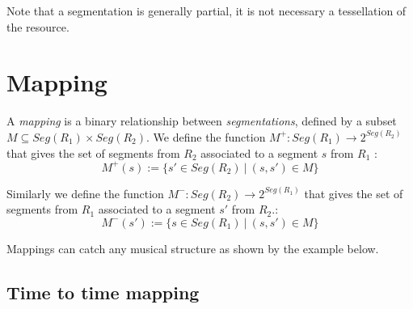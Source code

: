 \documentclass[letterpaper, 12pt]{article}
\newcommand{\seg}[1]			{Seg(#1)}
\begin{document}
Note that a segmentation is generally partial, it is not necessary a tessellation of the resource. %


\section{Mapping}
\label{resmap}



A \emph{mapping} is a binary relationship between \emph{segmentations}, defined by a subset $M\subseteq \seg{R_{1}}\times \seg{R_{2}}$. We define the function $M^{+} : \seg{R_1} \rightarrow 2^{\seg{R_2}}$ that gives the set of segments from $R_{2}$ associated to a segment $s$ from $R_{1}$ :
\begin{equation}
\label{eq:mplus}
	M^{+}(s) :=\{ s' \in \seg{R_{2}}\ |\ (s,s') \in M\}
\end{equation}
 

Similarly we define the function $M^{-} : \seg{R_2} \rightarrow 2^{\seg{R_1}}$ that gives the set of segments from $R_{1}$ associated to a segment $s'$ from $R_{2}$.:
\begin{equation}
\label{eq:mmoins}
	M^{-}(s') :=\{ s \in \seg{R_{1}}\ |\ (s,s') \in M\}
\end{equation}

Mappings can catch any musical structure as shown by the example below. 

\subsection{Time to time mapping}\label{subsec:ttmap}
\end{document}
